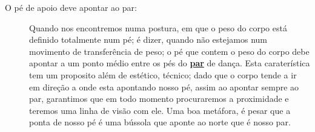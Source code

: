 \begin{description}
\item[O pé de apoio deve apontar ao par:] 
Quando nos encontremos numa postura, em que o peso do corpo está definido totalmente num pé;  
é dizer, quando não estejamos num movimento de transferência de peso;
o pé que contem o peso do corpo debe apontar a um ponto médio entre os pés do \hyperref[def:Par]{\textbf{par}} de dança.
Esta caraterística tem um proposito além de estético, técnico;
dado que o corpo tende a ir em direção a onde esta apontando nosso pé,
assim ao apontar sempre ao par, 
garantimos que em todo momento procuraremos a proximidade e teremos uma linha de visão  com ele.
Uma boa metáfora, é pesar que a ponta de nosso pé é uma bússola que aponte ao norte que é nosso par.
\end{description}
